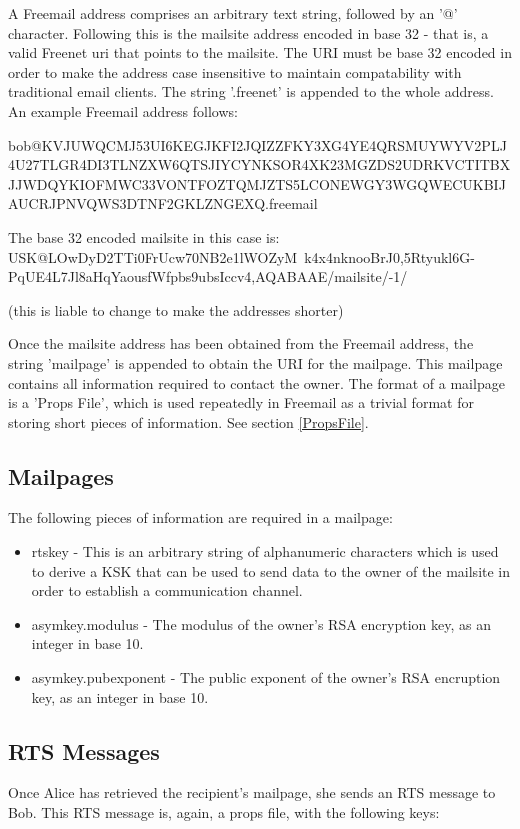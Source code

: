 \documentclass[12pt,a4paper]{article}
\begin{document}
A Freemail address comprises an arbitrary text string, followed by an '@' character. Following this is the mailsite address encoded in base 32 - that is, a valid Freenet uri that points to the mailsite. The URI must be base 32 encoded in order to make the address case insensitive to maintain compatability with traditional email clients. The string '.freenet' is appended to the whole address. An example Freemail address follows:

bob@KVJUWQCMJ53UI6KEGJKFI2JQIZZFKY3XG\-4YE4QRSMUYWYV2PLJ4U27TLG\-R4DI3TLNZXW6QTSJIYCYNKS\-OR4XK23MGZDS2UDRKVCTIT\-BXJJWDQYKIOFM\-WC33VONTFOZTQMJZTS5LCO\-NEWGY3WGQWECUKBIJA\-UCRJPNVQWS3DTNF\-2GKLZNGEXQ.freemail


The base 32 encoded mailsite in this case is: USK@LOwDyD2TTi0FrUcw70N\-B2e1lWOZyM~k4x4n\-knooBrJ0,5Rtyu\-kl6G-PqUE4L7\-Jl8aHqYaous\-fWfpbs9ubsI\-ccv4,AQABAAE/mailsite/-1/

(this is liable to change to make the addresses shorter)

Once the mailsite address has been obtained from the Freemail address, the string 'mailpage' is appended to obtain the URI for the mailpage. This mailpage contains all information required to contact the owner. The format of a mailpage is a 'Props File', which is used repeatedly in Freemail as a trivial format for storing short pieces of information. See section \ref{PropsFile}.

\subsection{Mailpages}
The following pieces of information are required in a mailpage:

\begin{itemize}
\item rtskey - This is an arbitrary string of alphanumeric characters which is used to derive a KSK that can be used to send data to the owner of the mailsite in order to establish a communication channel.
\item asymkey.modulus - The modulus of the owner's RSA encryption key, as an integer in base 10.
\item asymkey.pubexponent - The public exponent of the owner's RSA encruption key, as an integer in base 10.
\end{itemize}

\subsection{RTS Messages}
Once Alice has retrieved the recipient's mailpage, she sends an RTS message to Bob. This RTS message is, again, a props file, with the following keys:
\end{document}
